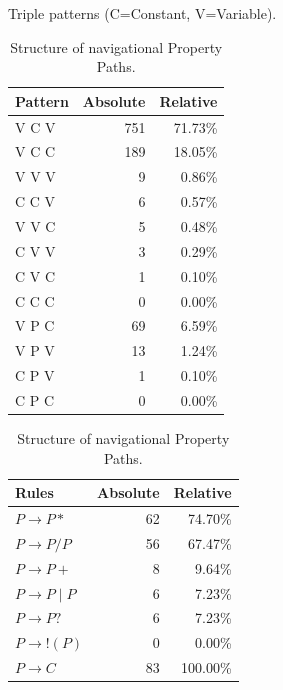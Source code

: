 \documentclass[runningheads]{llncs}
\begin{document}
\begin{table}[h]
	\begin{minipage}[b]{0.45\linewidth}
		\caption{Triple patterns (C=Constant, V=Variable).}
		\begin{tabular}{lrr}    \hline
			Pattern & Absolute & Relative \\    \hline
			V C V   & 751      & 71.73\%    \\
			V C C   & 189      & 18.05\%    \\
			V V V   & 9        & 0.86\%     \\
			C C V   & 6        & 0.57\%     \\
			V V C   & 5        & 0.48\%     \\
			C V V   & 3        & 0.29\%     \\
			C V C   & 1        & 0.10\%      \\
			C C C   & 0        & 0.00\%        \\    \hline
			V P C   & 69       & 6.59\%     \\
			V P V   & 13       & 1.24\%     \\
			C P V   & 1        & 0.10\%      \\
			C P C   & 0        & 0.00\%        \\    \hline
		\end{tabular}
		\label{tab:Pattern}
	\end{minipage}
	\hspace{1cm}
	\begin{minipage}[b]{0.45\linewidth}
		\caption{Structure of navigational Property Paths.}
		\label{tab:Path}
		\begin{tabular}{lrr}    \hline
			Rules                & Absolute & Relative \\    \hline
			$P \rightarrow P* $   & 62       & 74.70\%     \\
			$P \rightarrow P / P$  & 56       & 67.47\%    \\
			$P \rightarrow P+ $   & 8        & 9.64\%     \\
			$P \rightarrow P \mid P$  & 6        & 7.23\%     \\
			$P \rightarrow P? $   & 6        & 7.23\%     \\
			$P \rightarrow !(P)$ & 0        & 0.00\%        \\
			$P \rightarrow C $    & 83       & 100.00\%      \\    \hline
		\end{tabular}
	\end{minipage}
\end{table}
\end{document}
